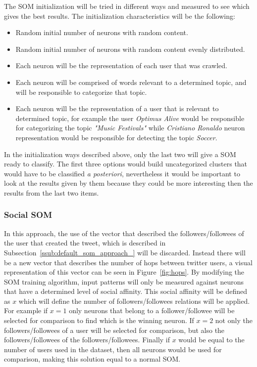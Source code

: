 The SOM initialization will be tried in different ways and measured to see which gives the best results. The initialization characteristics will be the following:
\begin{itemize}
  \item Random initial number of neurons with random content.
  \item Random initial number of neurons with random content evenly distributed.
  \item Each neuron will be the representation of each user that was crawled.
  \item Each neuron will be comprised of words relevant to a determined topic, and will be responsible to categorize that topic.
  \item Each neuron will be the representation of a user that is relevant to determined topic, for example the user \emph{Optimus Alive} would be responsible for categorizing the topic \textit{"Music Festivals"}  while \emph{Cristiano Ronaldo} neuron representation would be responsible for detecting the topic \emph{Soccer}.
\end{itemize}

In the initialization ways described above, only the last two will give a SOM ready to classify. The first three options would build uncategorized clusters that would have to be classified \emph{a posteriori}, nevertheless it would be important to look at the results given by them because they could be more interesting then the results from the last two items.

\subsubsection{Social SOM} %
\label{ssub:social_som}
In this approach, the use of the vector that described the followers/followees of the user that created the tweet, which is described  in Subsection~\ref{ssub:default_som_approach_} will be discarded. Instead there will be a new vector that describes the number of hops between twitter users, a visual representation of this vector can be seen in Figure~\ref{fig:hops}.
By modifying the SOM training algorithm, input patterns will only be measured against neurons that have a determined level of social affinity. This social affinity will be defined as \(x\) which will define the number of followers/followees relations will be applied. For example if \(x = 1\) only neurons that belong to a follower/followee will be selected for comparison to find which is the winning neuron. If \(x = 2\) not only the followers/followees of a user will be selected for comparison, but also the followers/followees of the followers/followees. Finally if \(x\) would be equal to the number of users used in the dataset, then all neurons would be used for comparison, making this solution equal to a normal SOM.


